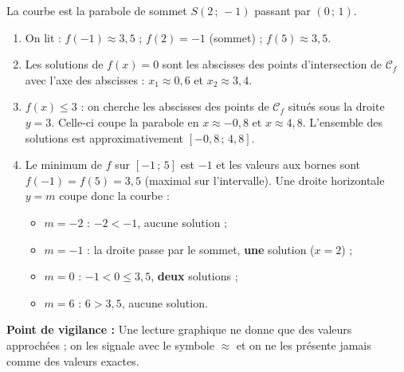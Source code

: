 \documentclass[11pt]{article}
\begin{document}
\begin{corrige}
La courbe est la parabole de sommet $S(2\,;\,-1)$ passant par $(0\,;\,1)$.
\begin{enumerate}
\item On lit : $f(-1)\approx 3,5$ ; $f(2)=-1$ (sommet) ; $f(5)\approx 3,5$.
\item Les solutions de $f(x)=0$ sont les abscisses des points d'intersection de $\mathcal{C}_{f}$ avec l'axe des abscisses : $x_{1}\approx 0,6$ et $x_{2}\approx 3,4$.
\item $f(x)\leq 3$ : on cherche les abscisses des points de $\mathcal{C}_{f}$ situés sous la droite $y=3$. Celle-ci coupe la parabole en $x\approx -0,8$ et $x\approx 4,8$. L'ensemble des solutions est approximativement $[-0,8\,;\,4,8]$.
\item Le minimum de $f$ sur $[-1\,;\,5]$ est $-1$ et les valeurs aux bornes sont $f(-1)=f(5)=3,5$ (maximal sur l'intervalle). Une droite horizontale $y=m$ coupe donc la courbe :
\begin{itemize}
\item $m=-2$ : $-2<-1$, aucune solution ;
\item $m=-1$ : la droite passe par le sommet, \textbf{une} solution ($x=2$) ;
\item $m=0$ : $-1<0\leq 3,5$, \textbf{deux} solutions ;
\item $m=6$ : $6>3,5$, aucune solution.
\end{itemize}
\end{enumerate}
\textbf{Point de vigilance :} Une lecture graphique ne donne que des valeurs approchées ; on les signale avec le symbole $\approx$ et on ne les présente jamais comme des valeurs exactes.
\end{corrige}
\end{document}
